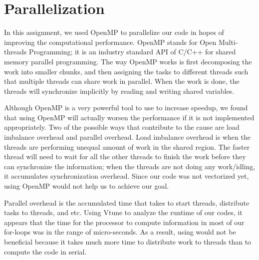 \section{Parallelization}\label{sec:parallelization}

In this assignment, we used OpenMP to parallelize our code in hopes of
improving the computational performance. OpenMP stands for Open Multi-threads
Programming; it is an industry standard API of C/C++ for shared memory parallel
programming.  The way OpenMP works is first decomposing the work into smaller
chunks, and then assigning the tasks to different threads such that multiple
threads can share work in parallel. When the work is done, the threads will
synchronize implicitly by reading and writing shared variables.

Although OpenMP is a very powerful tool to use to increase speedup, we found
that using OpenMP will actually worsen the performance if it is not implemented
appropriately. Two of the possible ways that contribute to the cause are load
imbalance overhead and parallel overhead. Load imbalance overhead is when the
threads are performing unequal amount of work in the shared region. The faster
thread will need to wait for all the other threads to finish the work before
they can synchronize the information; when the threads are not doing any
work/idling, it accumulates synchronization overhead. Since our code was not
vectorized yet, using OpenMP would not help us to achieve our goal.

Parallel overhead is the accumulated time that takes to start threads,
distribute tasks to threads, and etc. Using Vtune to analyze the runtime of our
codes, it appears that the time for the processor to compute information in
most of our for-loops was in the range of micro-seconds. As a result, using
 would not be beneficial because it takes much
more time to distribute work to threads than to compute the code in serial.
